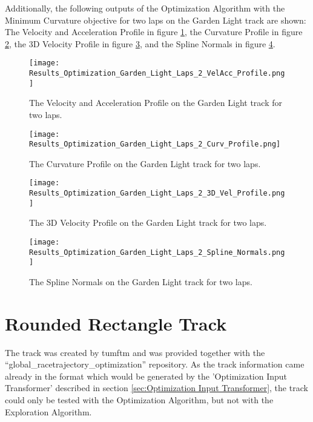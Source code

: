 Additionally, the following outputs of the Optimization Algorithm with the Minimum Curvature objective for two laps on the Garden Light track are shown: The Velocity and Acceleration Profile in figure \ref{fig:Results Garden Light Laps 2 VelAcc Profile}, the Curvature Profile in figure \ref{fig:Results Garden Light Laps 2 Curv Profile}, the 3D Velocity Profile in figure \ref{fig:Results Garden Light Laps 2 3D Vel Profile}, and the Spline Normals in figure \ref{fig:Results Garden Light Laps 2 Spline Normals}.
\begin{figure}[H]
    \centering
    \texttt{[image: Results\_Optimization\_Garden\_Light\_Laps\_2\_VelAcc\_Profile.png]}
    \caption{The Velocity and Acceleration Profile on the Garden Light track for two laps.}
    \label{fig:Results Garden Light Laps 2 VelAcc Profile}
\end{figure}
\begin{figure}[H]
    \centering
    \texttt{[image: Results\_Optimization\_Garden\_Light\_Laps\_2\_Curv\_Profile.png]}
    \caption{The Curvature Profile on the Garden Light track for two laps.}
    \label{fig:Results Garden Light Laps 2 Curv Profile}
\end{figure}
\begin{figure}[H]
    \centering
    \texttt{[image: Results\_Optimization\_Garden\_Light\_Laps\_2\_3D\_Vel\_Profile.png]}
    \caption{The 3D Velocity Profile on the Garden Light track for two laps.}
    \label{fig:Results Garden Light Laps 2 3D Vel Profile}
\end{figure}
\begin{figure}[H]
    \centering
    \texttt{[image: Results\_Optimization\_Garden\_Light\_Laps\_2\_Spline\_Normals.png]}
    \caption{The Spline Normals on the Garden Light track for two laps.}
    \label{fig:Results Garden Light Laps 2 Spline Normals}
\end{figure}

\section{Rounded Rectangle Track} \label{sec:Results Rounded Rectangle Track}
The track was created by \acrshort{tumftm} and was provided together with the ``global\_racetrajectory\_optimization'' repository. \cite{tumftm_optimization_algoritm}
As the track information came already in the format which would be generated by the 'Optimization Input Transformer' described in section \ref{sec:Optimization Input Transformer}, the track could only be tested with the Optimization Algorithm, but not with the Exploration Algorithm.

